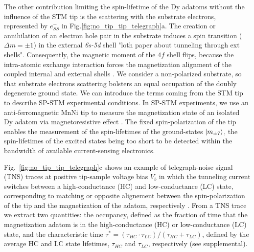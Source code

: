 \documentclass[
reprint,amsmath,amssymb,aps]{revtex4-2}
\begin{document}
The other contribution limiting the spin-lifetime of the Dy adatoms without the influence of the STM tip is the scattering with the substrate electrons, represented by $e^{-}_{SS}$ in Fig.\ref{fig:no_tip_tip_telegraph}a. The creation or annihilation of an electron hole pair in the substrate induces a spin transition ($\Delta m=\pm 1$) in the external \textit{6s-5d} shell \cite{}"loth paper about tunneling through ext shells". Consequently, the magnetic moment of the $4f$ shell flips, because the intra-atomic exchange interaction forces the magnetization alignment of the coupled internal and external shells \cite{pivetta2020}. We consider a non-polarized substrate, so that substrate electrons scattering bolsters an equal occupation of the doubly degenerate ground state.\newline
\indent We can introduce the terms coming from the STM tip to describe SP-STM experimental conditions.
In SP-STM experiments, we use an anti-ferromagnetic MnNi tip to measure the magnetization state of an isolated Dy adatom via magnetoresistive effect \cite{wiesendanger_ObservationVacuumTunneling_1990,Khajetoorians2013,paul_ControlMillisecondSpin_2017,Natterer2017,Natterer2018}. The fixed spin-polarization of the tip enables the measurement of the spin-lifetimes of the ground-states $\ket{m_{\pm7}}$, the spin-lifetimes of the excited states being too short to be detected within the bandwidth of available current-sensing electronics.


Fig.~\ref{fig:no_tip_tip_telegraph}c shows an example of telegraph-noise signal (TNS) traces at positive tip-sample voltage bias $V_b$ in which the tunneling current switches between a high-conductance (HC) and low-conductance (LC) state, corresponding to matching or opposite alignement between the spin-polarization of the tip and the magnetization of the adatom, respectively \cite{delgado2010,paul_ControlMillisecondSpin_2017}. 
From a TNS trace we extract two quantities: the occupancy, defined as the fraction of time that the magnetization adatom is in the high-conductance (HC) or low-conductance (LC) state, and the characteristic time $\tau ^*=(\tau_{HC}  \cdot \tau_{LC})/( \tau_{HC} + \tau_{LC})$, defined by the average HC and LC state lifetimes, $ \tau_{HC}$ and  $\tau_{LC}$, respectively \cite{Khajetoorians2013} (see supplemental). 
\end{document}
